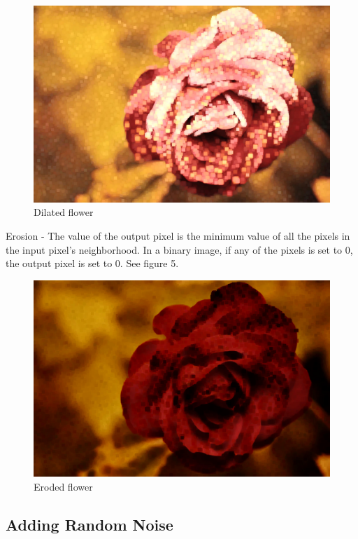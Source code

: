 \documentclass{article}
\begin{document}
\begin{figure}[h!]
\centering
\includegraphics[scale=0.05]{dilated_flower.jpg}
\caption{Dilated flower}
\end{figure}

Erosion - The value of the output pixel is the minimum value of all the pixels
in the input pixel's neighborhood. In a binary image, if any of the pixels is
set to 0, the output pixel is set to 0. See figure 5.

\begin{figure}[h!]
\centering
\includegraphics[scale=0.05]{eroded_flower.jpg}
\caption{Eroded flower}
\end{figure}

\subsection{Adding Random Noise}
\end{document}
